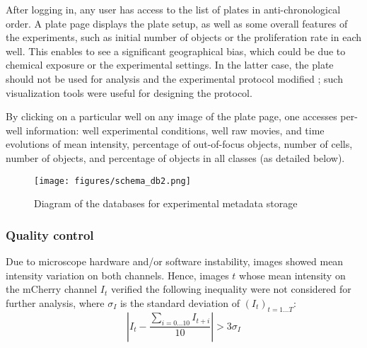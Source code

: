 After logging in, any user has access to the list of plates in anti-chronological order. A plate page displays the plate setup, as well as some overall features of the experiments, such as initial number of objects or the proliferation rate in each well. This enables to see a significant geographical bias, which could be due to chemical exposure or the experimental settings. In the latter case, the plate should not be used for analysis and the experimental protocol modified ; such visualization tools were useful for designing the protocol. 

By clicking on a particular well on any image of the plate page, one accesses per-well information: well experimental conditions, well raw movies, and time evolutions of mean intensity, percentage of out-of-focus objects, number of cells, number of objects, and percentage of objects in all classes (as detailed below).

\begin{figure}
\centering
\texttt{[image: figures/schema\_db2.png]}
\caption{Diagram of the databases for experimental metadata storage}
\label{db}
\end{figure}


\subsubsection{Quality control}
Due to microscope hardware and/or software instability, images showed mean intensity variation on both channels. Hence, images $t$ whose mean intensity on the mCherry channel $I_t$ verified the following inequality were not considered for further analysis, where $\sigma_I $ is the standard deviation of $(I_t)_{t=1\ldots T}$:
\[ |I_t- \dfrac{\sum_{i=0\ldots 10} I_{t+i} }{10}| > 3\sigma_I  \]

